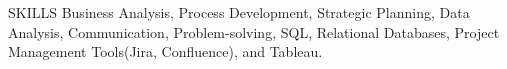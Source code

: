 \documentclass{resume} %
\begin{document}















\begin{rSection}{SKILLS} 
Business Analysis, Process Development, Strategic Planning, Data Analysis, Communication, Problem-solving, SQL, Relational Databases, Project Management Tools(Jira, Confluence), and Tableau.
\end{rSection}
\end{document}

